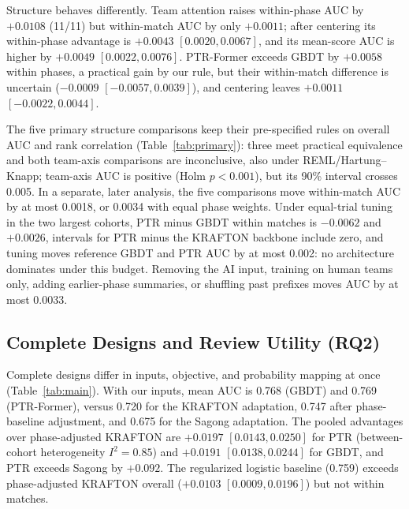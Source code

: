 \documentclass[sigconf,anonymous]{acmart}
\begin{document}
Structure behaves differently. Team attention raises within-phase AUC by $+0.0108$ (11/11) but within-match AUC by only $+0.0011$; after centering its within-phase advantage is $+0.0043$ $[0.0020,\allowbreak 0.0067]$, and its mean-score AUC is higher by $+0.0049$ $[0.0022,\allowbreak 0.0076]$. PTR-Former exceeds GBDT by $+0.0058$ within phases, a practical gain by our rule, but their within-match difference is uncertain ($-0.0009$ $[-0.0057,\allowbreak 0.0039]$), and centering leaves $+0.0011$ $[-0.0022,\allowbreak 0.0044]$.


The five primary structure comparisons keep their pre-specified rules on overall AUC and rank correlation (Table~\ref{tab:primary}): three meet practical equivalence and both team-axis comparisons are inconclusive, also under REML/Hartung--Knapp; team-axis AUC is positive (Holm $p<0.001$), but its 90\% interval crosses 0.005. In a separate, later analysis, the five comparisons move within-match AUC by at most 0.0018, or 0.0034 with equal phase weights. Under equal-trial tuning in the two largest cohorts, PTR minus GBDT within matches is $-0.0062$ and $+0.0026$, intervals for PTR minus the KRAFTON backbone include zero, and tuning moves reference GBDT and PTR AUC by at most 0.002: no architecture dominates under this budget. Removing the AI input, training on human teams only, adding earlier-phase summaries, or shuffling past prefixes moves AUC by at most 0.0033.

\subsection{Complete Designs and Review Utility (RQ2)}
\label{sec:results:designs}

Complete designs differ in inputs, objective, and probability mapping at once (Table~\ref{tab:main}). With our inputs, mean AUC is 0.768 (GBDT) and 0.769 (PTR-Former), versus 0.720 for the KRAFTON adaptation, 0.747 after phase-baseline adjustment, and 0.675 for the Sagong adaptation. The pooled advantages over phase-adjusted KRAFTON are $+0.0197$ $[0.0143,\allowbreak 0.0250]$ for PTR (between-cohort heterogeneity $I^2=0.85$) and $+0.0191$ $[0.0138,\allowbreak 0.0244]$ for GBDT, and PTR exceeds Sagong by $+0.092$. The regularized logistic baseline (0.759) exceeds phase-adjusted KRAFTON overall ($+0.0103$ $[0.0009,\allowbreak 0.0196]$) but not within matches.
\end{document}
